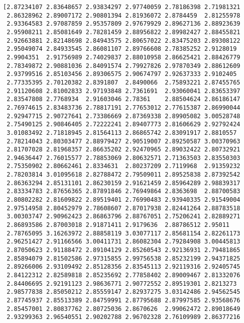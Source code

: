 \documentclass[11pt]{article}
\begin{document}
    \begin{Verbatim}[commandchars=\\\{\}]
[2.87234107 2.83648657 2.93834297 2.97740059 2.78186398 2.71981321
 2.86328962 2.89007172 2.90801394 2.81936072 2.8784459  2.81255978
 2.93364583 2.97087859 2.95357809 2.97679929 2.89627136 2.88923639
 2.95908211 2.85081649 2.78281459 2.88956822 2.89982427 2.88455821
 2.92663881 2.82148698 2.84943575 2.80657022 2.83475203 2.89308122
 2.95049074 2.84933545 2.86081107 2.89766608 2.78385252 2.9128019
 2.9904351  2.91756989 2.74029837 2.88010958 2.86625421 2.88426779
 2.78349872 2.90881036 2.84091574 2.79927826 2.97870349 2.88612609
 2.93799516 2.85103456 2.89306575 2.90674797 2.92637333 2.9102405
 2.77335395 2.70120382 2.8391807  2.8490066  2.75893221 2.87455765
 2.91120608 2.81002833 2.97193848 2.7361691  2.93060041 2.83653397
 2.83547808 2.7768934  2.91603046 2.78361    2.88504624 2.86186147
 2.76974615 2.83483736 2.78817191 2.77653012 2.77615387 2.86990044
 2.92947715 2.90727641 2.73386669 2.87369338 2.89905082 3.00528748
 2.75490125 2.90846405 2.72222241 2.89407773 2.81606629 2.92792424
 3.01083492 2.71818945 2.81564113 2.86865742 2.83091917 2.8810557
 2.78214043 2.80303477 2.88979427 2.90519007 2.89250587 3.00370963
 2.81707028 2.81968357 2.86635202 2.92470965 2.89032422 2.80732921
 2.94636447 2.76015577 2.78853069 2.80632571 2.71363503 2.83550303
 2.75350902 2.80662461 2.8334631  2.80237209 2.7119968  2.91359232
 2.78203814 3.01095618 2.82788472 2.79509011 2.89525838 2.87392542
 2.86363294 2.85131101 2.86230159 2.91621459 2.85964289 2.98839317
 2.83334783 2.87656365 2.87891846 2.76949864 2.8363698  2.88700583
 2.80802282 2.81609822 2.89519401 2.76990483 2.93940335 2.91549004
 2.97514958 2.80452979 2.78608607 2.87017938 2.82441264 2.88783518
 3.00303747 2.90962423 2.86863796 2.88767051 2.75206241 2.82889271
 2.86893586 2.87003018 2.91871411 2.9179636  2.88786512 2.95011
 2.78765095 3.16263972 2.88858119 3.03077117 2.85681154 2.82261173
 2.96251427 2.91166566 3.00411731 2.86082304 2.79284908 3.00445813
 2.87050623 2.91188472 2.89104129 2.85260543 2.92136931 2.79481865
 2.85894079 2.81502586 2.97315855 2.99756538 2.85232199 2.94371825
 2.89266006 2.93109492 2.85128356 2.83545113 2.92119316 2.92405745
 2.84122312 2.82589818 2.85235692 2.77858402 2.89009467 2.81332076
 2.84406695 2.92191123 2.98636771 2.90772552 2.89519301 2.8213273
 2.98577838 2.85050212 2.85559147 2.82937275 3.03142486 2.94562545
 2.87745937 2.85513389 2.84759991 2.87795688 2.87997585 2.93568676
 2.85457001 2.80837762 2.80725036 2.8670626  2.99062472 2.89018649
 2.93299363 2.96540551 2.90202788 2.96702328 2.76109989 2.86377216

\end{Verbatim}
\end{document}
